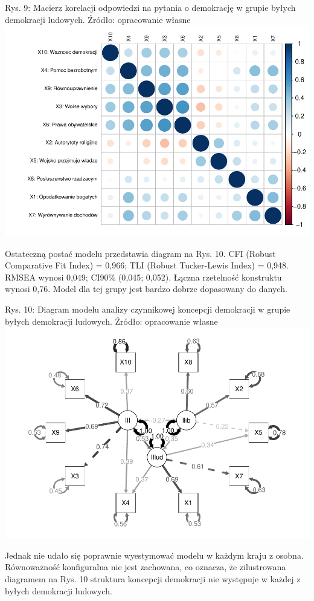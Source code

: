 \documentclass[12pt]{article}
\begin{document}
Rys. 9: Macierz korelacji odpowiedzi na pytania o demokrację w grupie byłych demokracji ludowych. Źródło: opracowanie własne
\includegraphics{text_ASA_files/figure-latex/cor-matrix-east-1.pdf}

Ostateczną postać modelu przedstawia diagram na Rys. 10. CFI (Robust Comparative Fit Index) = 0,966; TLI (Robust Tucker-Lewis Index) = 0,948. RMSEA wynosi 0,049; CI90\% (0,045; 0,052). Łączna rzetelność konstruktu wynosi 0,76. Model dla tej grupy jest bardzo dobrze dopasowany do danych.

Rys. 10: Diagram modelu analizy czynnikowej koncepcji demokracji w grupie byłych demokracji ludowych. Źródło: opracowanie własne
\includegraphics{text_ASA_files/figure-latex/diagram-east-1.pdf}

Jednak nie udało się poprawnie wyestymować modelu w każdym kraju z osobna. Równoważność konfiguralna nie jest zachowana, co oznacza, że zilustrowana diagramem na Rys. 10 struktura koncepcji demokracji nie występuje w każdej z byłych demokracji ludowych.



\end{document}
